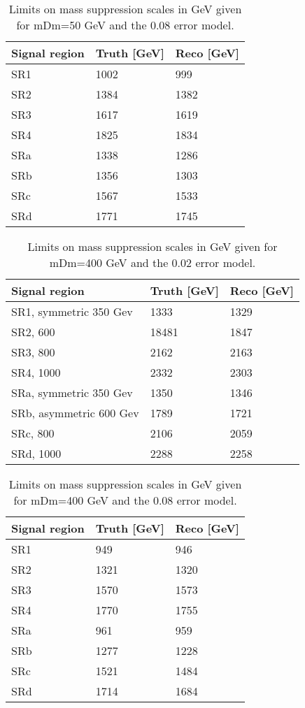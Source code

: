 \begin{table}[ht]
\begin{center}
\begin{tabular}{|l|l|l|}
\hline
Signal region & Truth [GeV]& Reco [GeV]\\ \hline
SR1&1002&999\\
SR2&1384&1382\\
SR3&1617&1619\\
SR4&1825&1834\\ \hline
SRa&1338&1286\\
SRb&1356&1303\\
SRc&1567&1533\\
SRd&1771&1745\\ \hline
\end{tabular}
\caption{Limits on mass suppression scales in GeV given for mDm=50 GeV and the 0.08 error model.}
\label{tab:masssupp010}
\end{center}
\end{table}

\begin{table}[ht!]
\begin{center}
\begin{tabular}{|l|l|l|}
\hline
Signal region & Truth [GeV]& Reco [GeV]\\ \hline
SR1, symmetric 350 Gev &1333&1329\\
SR2, 600&18481&1847\\
SR3, 800&2162&2163\\
SR4, 1000&2332&2303\\ \hline
SRa, symmetric 350 Gev&1350&1346\\
SRb, asymmetric 600 Gev&1789&1721\\
SRc, 800&2106&2059\\
SRd, 1000&2288&2258\\ \hline
\end{tabular}
\caption{Limits on mass suppression scales in GeV given for mDm=400 GeV and the 0.02 error model.}
\label{tab:masssupp2002}
\end{center}
\end{table}

\begin{table}[ht]
\begin{center}
\begin{tabular}{|l|l|l|}
\hline
Signal region & Truth [GeV]& Reco [GeV]\\ \hline
SR1&949&946\\
SR2&1321&1320\\
SR3&1570&1573\\
SR4&1770&1755\\ \hline

SRa&961&959\\
SRb&1277&1228\\
SRc&1521&1484\\
SRd&1714&1684\\ \hline
\end{tabular}
\caption{Limits on mass suppression scales in GeV given for mDm=400 GeV and the 0.08 error model.}

\label{tab:masssupp2010}
\end{center}
\end{table}

